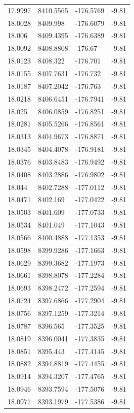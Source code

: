 \begin{table}[H]
\begin{tabular}{llll}
17.9997 & 8410.5565 & -176.5769 & -9.81 \\
18.0028 & 8409.998 & -176.6079 & -9.81 \\
18.006 & 8409.4395 & -176.6389 & -9.81 \\
18.0092 & 8408.8808 & -176.67 & -9.81 \\
18.0123 & 8408.322 & -176.701 & -9.81 \\
18.0155 & 8407.7631 & -176.732 & -9.81 \\
18.0187 & 8407.2042 & -176.763 & -9.81 \\
18.0218 & 8406.6451 & -176.7941 & -9.81 \\
18.025 & 8406.0859 & -176.8251 & -9.81 \\
18.0281 & 8405.5266 & -176.8561 & -9.81 \\
18.0313 & 8404.9673 & -176.8871 & -9.81 \\
18.0345 & 8404.4078 & -176.9181 & -9.81 \\
18.0376 & 8403.8483 & -176.9492 & -9.81 \\
18.0408 & 8403.2886 & -176.9802 & -9.81 \\
18.044 & 8402.7288 & -177.0112 & -9.81 \\
18.0471 & 8402.169 & -177.0422 & -9.81 \\
18.0503 & 8401.609 & -177.0733 & -9.81 \\
18.0534 & 8401.049 & -177.1043 & -9.81 \\
18.0566 & 8400.4888 & -177.1353 & -9.81 \\
18.0598 & 8399.9286 & -177.1663 & -9.81 \\
18.0629 & 8399.3682 & -177.1973 & -9.81 \\
18.0661 & 8398.8078 & -177.2284 & -9.81 \\
18.0693 & 8398.2472 & -177.2594 & -9.81 \\
18.0724 & 8397.6866 & -177.2904 & -9.81 \\
18.0756 & 8397.1259 & -177.3214 & -9.81 \\
18.0787 & 8396.565 & -177.3525 & -9.81 \\
18.0819 & 8396.0041 & -177.3835 & -9.81 \\
18.0851 & 8395.443 & -177.4145 & -9.81 \\
18.0882 & 8394.8819 & -177.4455 & -9.81 \\
18.0914 & 8394.3207 & -177.4765 & -9.81 \\
18.0946 & 8393.7594 & -177.5076 & -9.81 \\
18.0977 & 8393.1979 & -177.5386 & -9.81 \\

\end{tabular}
\end{table}
